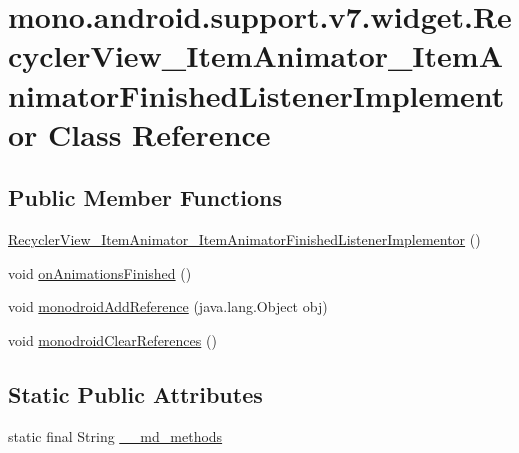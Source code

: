 \hypertarget{classmono_1_1android_1_1support_1_1v7_1_1widget_1_1_recycler_view___item_animator___item_animator_finished_listener_implementor}{
\section{mono.android.support.v7.widget.RecyclerView\_\-ItemAnimator\_\-ItemAnimatorFinishedListenerImplementor Class Reference}
\label{classmono_1_1android_1_1support_1_1v7_1_1widget_1_1_recycler_view___item_animator___item_animator_finished_listener_implementor}
}
\subsection*{Public Member Functions}
\begin{CompactItemize}
\item 
\hyperlink{classmono_1_1android_1_1support_1_1v7_1_1widget_1_1_recycler_view___item_animator___item_animator_finished_listener_implementor_5abc82f3b22b6baa72a8dc7d9b556b42}{RecyclerView\_\-ItemAnimator\_\-ItemAnimatorFinishedListenerImplementor} ()
\item 
void \hyperlink{classmono_1_1android_1_1support_1_1v7_1_1widget_1_1_recycler_view___item_animator___item_animator_finished_listener_implementor_f2e37040545c954c7e94e7200153ff5f}{onAnimationsFinished} ()
\item 
void \hyperlink{classmono_1_1android_1_1support_1_1v7_1_1widget_1_1_recycler_view___item_animator___item_animator_finished_listener_implementor_01b744e4c5f6525fa3bd405e255c61db}{monodroidAddReference} (java.lang.Object obj)
\item 
void \hyperlink{classmono_1_1android_1_1support_1_1v7_1_1widget_1_1_recycler_view___item_animator___item_animator_finished_listener_implementor_1853ddf2c642012c0871d0d79c2b09d5}{monodroidClearReferences} ()
\end{CompactItemize}
\subsection*{Static Public Attributes}
\begin{CompactItemize}
\item 
static final String \hyperlink{classmono_1_1android_1_1support_1_1v7_1_1widget_1_1_recycler_view___item_animator___item_animator_finished_listener_implementor_b61d1754d9a39a88b3accee404008012}{\_\-\_\-md\_\-methods}
\end{CompactItemize}
